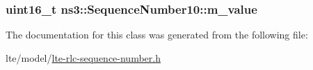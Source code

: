 \subsubsection[{\texorpdfstring{m\+\_\+value}{m_value}}]{\setlength{\rightskip}{0pt plus 5cm}uint16\+\_\+t ns3\+::\+Sequence\+Number10\+::m\+\_\+value\hspace{0.3cm}{\ttfamily [private]}}\hypertarget{classns3_1_1SequenceNumber10_a7bb01e339a81919cb8a512463642b706}{}\label{classns3_1_1SequenceNumber10_a7bb01e339a81919cb8a512463642b706}


The documentation for this class was generated from the following file\+:\begin{DoxyCompactItemize}
\item 
lte/model/\hyperlink{lte-rlc-sequence-number_8h}{lte-\/rlc-\/sequence-\/number.\+h}\end{DoxyCompactItemize}

